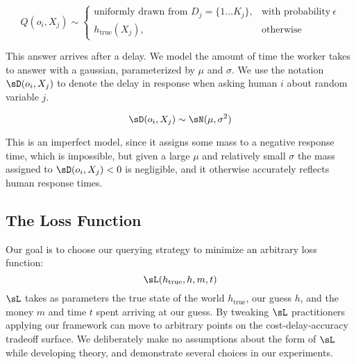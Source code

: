 \begin{equation}
    Q(o_i, X_j) \sim
    \begin{cases}
       \text{uniformly drawn from } D_j = \{1 \ldots K_j\}, & \text{with probability}\ \epsilon \\
      h_{\text{true}}(X_j), & \text{otherwise}
    \end{cases}
 \end{equation}
 
This answer arrives after a delay.
 We model the amount of time the worker takes to answer with a gaussian, parameterized by $\mu$ and $\sigma$.
 We use the notation $\sD(o_i, X_j)$ to denote the delay in response when asking human $i$ about random variable $j$.

\[\sD(o_i, X_j) \sim \sN(\mu, \sigma^2)\]

This is an imperfect model, since it assigns some mass to a negative response time, which is impossible, but given a large $\mu$ and relatively small $\sigma$ the mass assigned to $\sD(o_i, X_j) < 0$ is negligible, and it otherwise accurately reflects human response times.

\subsection{The Loss Function}

Our goal is to choose our querying strategy to minimize an arbitrary loss function:
\[\sL(h_{\text{true}}, h, m, t)\]
$\sL$ takes as parameters the true state of the world $h_{\text{true}}$, our guess $h$, and the money $m$ and time $t$ spent arriving at our guess.
 By tweaking $\sL$ practitioners applying our framework can move to arbitrary points on the cost-delay-accuracy tradeoff surface.
 We deliberately make no assumptions about the form of $\sL$ while developing theory, and demonstrate several choices in our experiments.

